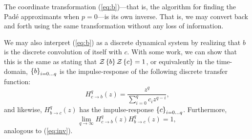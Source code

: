 The coordinate transformation (\ref{eq:b})---that is, the algorithm for finding the Pad\'e approximants when $p = 0$---is its own inverse. That is, we may convert back and forth using the same transformation without any loss of information.

We may also interpret (\ref{eq:b}) as a discrete dynamical system by realizing that $b$ is the discrete convolution of itself with $c$. With some work, we can show that this is the same as stating that $\mathcal{Z} \left\{ b \right\}\mathcal{Z} \left\{ c \right\} = 1$, or equivalently in the time-domain, $\left\{ b \right\}_{i=0\ldots q}$ is the impulse-response of the following discrete transfer function:
$$
H^q_{c \rightarrow b}(z) = \frac{z^{q}}{\sum_{i=0}^q c_i z^{q - i}} \text{,}
$$
and likewise, $H^q_{b \rightarrow c}(z)$ has the impulse-response $\left\{ c \right\}_{i=0\ldots q}$.
Furthermore, $$\lim_{q \rightarrow \infty} H^q_{c \rightarrow b}(z) H^q_{b \rightarrow c}(z) = 1,$$ analogous to (\ref{eq:inv}).
